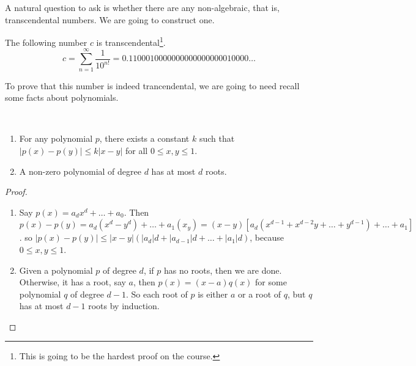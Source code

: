 A natural question to ask is whether there are any non-algebraic, that is, transcendental numbers.
We are going to construct one.

\begin{theorem}\label{thm:c-trancendental}
	The following number $c$ is transcendental\footnote{This is going to be the hardest proof on the course.}.
	$$
	c = \sum_{n = 1}^\infty \frac{1}{10^{n!}} = 0.1100010000000000000000010000\dots
	$$
\end{theorem}

To prove that this number is indeed trancendental, we are going to need recall some facts about polynomials.

\begin{proposition}~
	\vspace*{-1.5\baselineskip}
\begin{enumerate}[label=(\roman*)]
	\item For any polynomial $p$, there exists a constant $k$ such that $|p(x) - p(y)| \leq k|x - y|$ for all $0 \leq x, y \leq 1$.
	\item A non-zero polynomial of degree $d$ has at most $d$ roots.
\end{enumerate}
\end{proposition}
\begin{proof}$ $
	\begin{enumerate}[label=(\roman*)]
		\item Say $p(x) = a_d x^d + \dots + a_0$. Then $p(x) - p(y) = a_d(x^d - y^d) + \dots + a_1(x _ y) = (x - y)\left[a_d(x^{d - 1} + x^{d - 2}y + \dots + y^{d - 1}) + \dots + a_1\right]$.
		 so $|p(x) - p(y)| \leq |x - y| \left(|a_d|d + |a_{d - 1}|d + \dots + |a_1|d\right)$, because $0 \leq x, y \leq 1$.
		\item Given a polynomial $p$ of degree $d$, if $p$ has no roots, then we are done. Otherwise, it has a root, say $a$, then $p(x) = (x - a)q(x)$ for some polynomial $q$ of degree $d - 1$. So each root of $p$ is either $a$ or a root of $q$, but $q$ has at most $d - 1$ roots by induction. 
	\end{enumerate}
\end{proof}


